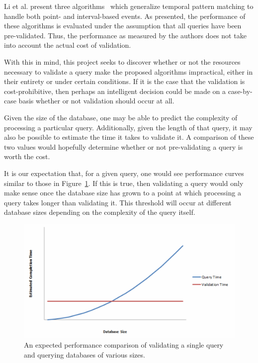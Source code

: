 \documentclass{achemso}
\begin{document}
Li et al. present three algorithms~\cite{Li:2011} which generalize temporal pattern matching to handle both point- and interval-based events. As presented, the performance of these algorithms is evaluated under the assumption that all queries have been pre-validated. Thus, the performance as measured by the authors does not take into account the actual cost of validation.

With this in mind, this project seeks to discover whether or not the resources necessary to validate a query make the proposed algorithms impractical, either in their entirety or under certain conditions. If it is the case that the validation is cost-prohibitive, then perhaps an intelligent decision could be made on a case-by-case basis whether or not validation should occur at all.

Given the size of the database, one may be able to predict the complexity of processing a particular query. Additionally, given the length of that query, it may also be possible to estimate the time it takes to validate it. A comparison of these two values would hopefully determine whether or not pre-validating a query is worth the cost.

It is our expectation that, for a given query, one would see performance curves similar to those in Figure~\ref{figure:expectation}.  If this is true, then validating a query would only make sense once the database size has grown to a point at which processing a query takes longer than validating it.  This threshold will occur at different database sizes depending on the complexity of the query itself.

\begin{figure}[h!]
  \centering
	\includegraphics[scale=0.25]{expectation.png}
     \caption{An expected performance comparison of validating a single query and querying databases of various sizes.}
    \label{figure:expectation}
\end{figure}
\end{document}
